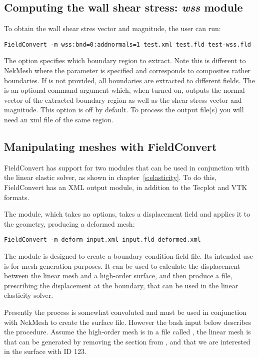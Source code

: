 \subsection{Computing the wall shear stress: \textit{wss} module}
To obtain the wall shear stres vector and magnitude, the user can run:
\begin{lstlisting}[style=BashInputStyle]
FieldConvert -m wss:bnd=0:addnormals=1 test.xml test.fld test-wss.fld
\end{lstlisting}
The option  specifies which boundary region to extract. Note this is different to NekMesh where the parameter  is specified and corresponds to composites rather boundaries. If  is not provided, all boundaries are extracted to different fields. The  is an optional command argument which, when turned on, outputs the normal vector of the extracted boundary region as well as the shear stress vector and magnitude. This option is off by default. To process the output file(s) you will need an xml file of the same region.
%
%
%

\subsection{Manipulating meshes with FieldConvert}
FieldConvert has support for two modules that can be used in conjunction with
the linear elastic solver, as shown in chapter~\ref{s:elasticity}. To do this,
FieldConvert has an XML output module, in addition to the Tecplot and VTK
formats.

The  module, which takes no options, takes a displacement field
and applies it to the geometry, producing a deformed mesh:
\begin{lstlisting}[style=BashInputStyle]
FieldConvert -m deform input.xml input.fld deformed.xml
\end{lstlisting}

The  module is designed to create a boundary condition field
file. Its intended use is for mesh generation purposes. It can be used to
calculate the displacement between the linear mesh and a high-order surface, and
then produce a  file, prescribing the displacement at the boundary,
that can be used in the linear elasticity solver.

Presently the process is somewhat convoluted and must be used in conjunction
with NekMesh to create the surface file. However the bash input below
describes the procedure. Assume the high-order mesh is in a file called
, the linear mesh is  that can be
generated by removing the  section from , and that
we are interested in the surface with ID 123.

